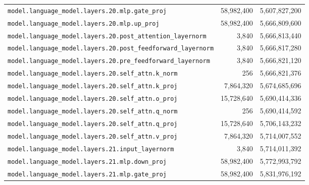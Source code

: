\documentclass[10pt,a4paper]{article}
\theoremstyle{definition}
\begin{document}
\begin{appendices}
\begin{longtable}{p{9.5cm}rr}
\texttt{model.\allowbreak{}language\_model.\allowbreak{}layers.\allowbreak{}20.\allowbreak{}mlp.\allowbreak{}gate\_proj} & 58,982,400 & 5,607,827,200 \\
\texttt{model.\allowbreak{}language\_model.\allowbreak{}layers.\allowbreak{}20.\allowbreak{}mlp.\allowbreak{}up\_proj} & 58,982,400 & 5,666,809,600 \\
\texttt{model.\allowbreak{}language\_model.\allowbreak{}layers.\allowbreak{}20.\allowbreak{}post\_attention\_layernorm} & 3,840 & 5,666,813,440 \\
\texttt{model.\allowbreak{}language\_model.\allowbreak{}layers.\allowbreak{}20.\allowbreak{}post\_feedforward\_layernorm} & 3,840 & 5,666,817,280 \\
\texttt{model.\allowbreak{}language\_model.\allowbreak{}layers.\allowbreak{}20.\allowbreak{}pre\_feedforward\_layernorm} & 3,840 & 5,666,821,120 \\
\texttt{model.\allowbreak{}language\_model.\allowbreak{}layers.\allowbreak{}20.\allowbreak{}self\_attn.\allowbreak{}k\_norm} & 256 & 5,666,821,376 \\
\texttt{model.\allowbreak{}language\_model.\allowbreak{}layers.\allowbreak{}20.\allowbreak{}self\_attn.\allowbreak{}k\_proj} & 7,864,320 & 5,674,685,696 \\
\texttt{model.\allowbreak{}language\_model.\allowbreak{}layers.\allowbreak{}20.\allowbreak{}self\_attn.\allowbreak{}o\_proj} & 15,728,640 & 5,690,414,336 \\
\texttt{model.\allowbreak{}language\_model.\allowbreak{}layers.\allowbreak{}20.\allowbreak{}self\_attn.\allowbreak{}q\_norm} & 256 & 5,690,414,592 \\
\texttt{model.\allowbreak{}language\_model.\allowbreak{}layers.\allowbreak{}20.\allowbreak{}self\_attn.\allowbreak{}q\_proj} & 15,728,640 & 5,706,143,232 \\
\texttt{model.\allowbreak{}language\_model.\allowbreak{}layers.\allowbreak{}20.\allowbreak{}self\_attn.\allowbreak{}v\_proj} & 7,864,320 & 5,714,007,552 \\
\texttt{model.\allowbreak{}language\_model.\allowbreak{}layers.\allowbreak{}21.\allowbreak{}input\_layernorm} & 3,840 & 5,714,011,392 \\
\texttt{model.\allowbreak{}language\_model.\allowbreak{}layers.\allowbreak{}21.\allowbreak{}mlp.\allowbreak{}down\_proj} & 58,982,400 & 5,772,993,792 \\
\texttt{model.\allowbreak{}language\_model.\allowbreak{}layers.\allowbreak{}21.\allowbreak{}mlp.\allowbreak{}gate\_proj} & 58,982,400 & 5,831,976,192 \\

\end{longtable}
\end{appendices}
\end{document}

